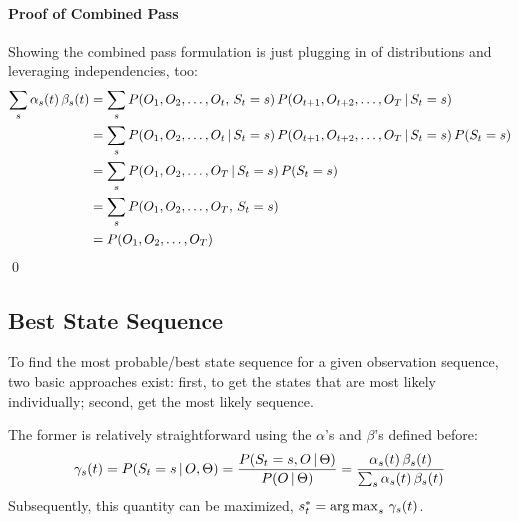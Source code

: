 			\paragraph{Proof of Combined Pass}
				Showing the combined pass formulation is just plugging in of distributions and leveraging independencies, too:
				\begin{align}
					\sum_s \alpha_s(t) \, \beta_s(t)
					 & = \sum_s P(O_1, O_2, \dots, O_t,\, S_t = s) \, P(O_{t + 1}, O_{t + 2}, \dots, O_T \,\vert\, S_t = s)                   \\
					 & = \sum_s P(O_1, O_2, \dots, O_t \,\vert\, S_t = s) \, P(O_{t + 1}, O_{t + 2}, \dots, O_T \,\vert\, S_t = s) \, P(S_t = s) \\
					 & = \sum_s P(O_1, O_2, \dots, O_T \,\vert\, S_t = s) \, P(S_t = s)                                                       \\
					 & = \sum_s P(O_1, O_2, \dots, O_T,\, S_t = s)                                                                         \\
					 & = P(O_1, O_2, \dots, O_T)
				\end{align}
				\qed

		\subsection{Best State Sequence}
			To find the most probable/best state sequence for a given observation sequence, two basic approaches exist: first, to get the states that are most likely individually; second, get the most likely sequence.

			The former is relatively straightforward using the \(\alpha\)'s and \(\beta\)'s defined before:
			\begin{equation}
				\gamma_s(t)
				= P(S_t = s \,\vert\, O, \Theta)
				= \frac{P(S_t = s, O \,\vert\, \Theta)}{P(O \,\vert\, \Theta)}
				= \frac{\alpha_s(t) \, \beta_s(t)}{\sum_s \alpha_s(t) \, \beta_s(t)}
			\end{equation}
			Subsequently, this quantity can be maximized, \( s_t^\ast = \operatorname*{arg\,max}_s \, \gamma_s(t) \).

